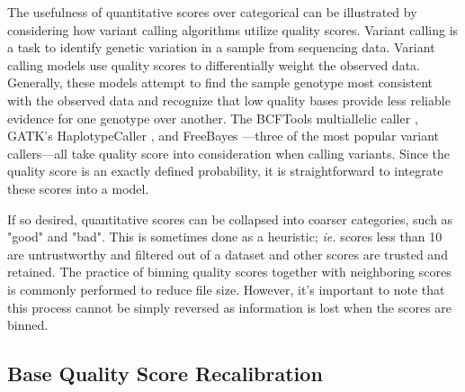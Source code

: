 The usefulness of quantitative scores over categorical can be illustrated by considering how variant calling algorithms utilize quality scores.
Variant calling is a task to identify genetic variation in a sample from sequencing data.
Variant calling models use quality scores to differentially weight the observed data. Generally, these models attempt to find the sample genotype most consistent with the observed data and recognize that low quality bases provide less reliable evidence for one genotype over another. The BCFTools multiallelic caller \parencite{li_sequence_2009}, GATK's HaplotypeCaller \parencite{poplin_scaling_2018}, and FreeBayes \parencite{garrison_haplotype-based_2012}---three of the most popular variant callers---all take quality score into consideration when calling variants.
Since the quality score is an exactly defined probability, it is straightforward to integrate these scores into a model.

If so desired, quantitative scores can be collapsed into coarser categories, such as "good" and "bad". This is sometimes done as a heuristic; \textit{ie.} scores less than 10 are untrustworthy and filtered out of a dataset and other scores are trusted and retained.
The practice of binning quality scores together with neighboring scores is commonly performed to reduce file size. %
However, it's important to note that this process cannot be simply reversed as information is lost when the scores are binned.

\subsection{Base Quality Score Recalibration}

